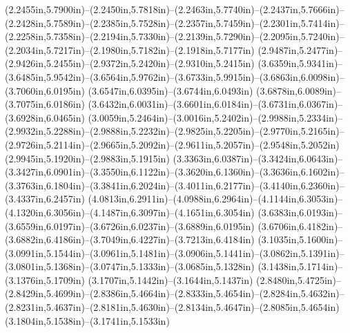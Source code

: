 (2.2455in,5.7900in)--(2.2450in,5.7818in)--(2.2463in,5.7740in)--(2.2437in,5.7666in)--(2.2428in,5.7589in)--(2.2385in,5.7528in)--(2.2357in,5.7459in)--(2.2301in,5.7414in)--(2.2258in,5.7358in)--(2.2194in,5.7330in)--(2.2139in,5.7290in)--(2.2095in,5.7240in)--(2.2034in,5.7217in)--(2.1980in,5.7182in)--(2.1918in,5.7177in) (2.9487in,5.2477in)--(2.9426in,5.2455in)--(2.9372in,5.2420in)--(2.9310in,5.2415in) (3.6359in,5.9341in)--(3.6485in,5.9542in)--(3.6564in,5.9762in)--(3.6733in,5.9915in)--(3.6863in,6.0098in)--(3.7060in,6.0195in) (3.6547in,6.0395in)--(3.6744in,6.0493in) (3.6878in,6.0089in)--(3.7075in,6.0186in) (3.6432in,6.0031in)--(3.6601in,6.0184in)--(3.6731in,6.0367in)--(3.6928in,6.0465in) (3.0059in,5.2464in)--(3.0016in,5.2402in)--(2.9988in,5.2334in)--(2.9932in,5.2288in)--(2.9888in,5.2232in)--(2.9825in,5.2205in)--(2.9770in,5.2165in)--(2.9726in,5.2114in)--(2.9665in,5.2092in)--(2.9611in,5.2057in)--(2.9548in,5.2052in) (2.9945in,5.1920in)--(2.9883in,5.1915in) (3.3363in,6.0387in)--(3.3424in,6.0643in)--(3.3427in,6.0901in)--(3.3550in,6.1122in)--(3.3620in,6.1360in)--(3.3636in,6.1602in)--(3.3763in,6.1804in)--(3.3841in,6.2024in)--(3.4011in,6.2177in)--(3.4140in,6.2360in)--(3.4337in,6.2457in) (4.0813in,6.2911in)--(4.0988in,6.2964in)--(4.1144in,6.3053in)--(4.1320in,6.3056in)--(4.1487in,6.3097in)--(4.1651in,6.3054in) (3.6383in,6.0193in)--(3.6559in,6.0197in)--(3.6726in,6.0237in)--(3.6889in,6.0195in) (3.6706in,6.4182in)--(3.6882in,6.4186in)--(3.7049in,6.4227in)--(3.7213in,6.4184in) (3.1035in,5.1600in)--(3.0991in,5.1544in)--(3.0961in,5.1481in)--(3.0906in,5.1441in)--(3.0862in,5.1391in)--(3.0801in,5.1368in)--(3.0747in,5.1333in)--(3.0685in,5.1328in) (3.1438in,5.1714in)--(3.1376in,5.1709in) (3.1707in,5.1442in)--(3.1644in,5.1437in) (2.8480in,5.4725in)--(2.8429in,5.4699in)--(2.8386in,5.4664in)--(2.8333in,5.4654in)--(2.8284in,5.4632in)--(2.8231in,5.4637in)--(2.8181in,5.4630in)--(2.8134in,5.4647in)--(2.8085in,5.4654in) (3.1804in,5.1538in)--(3.1741in,5.1533in)
